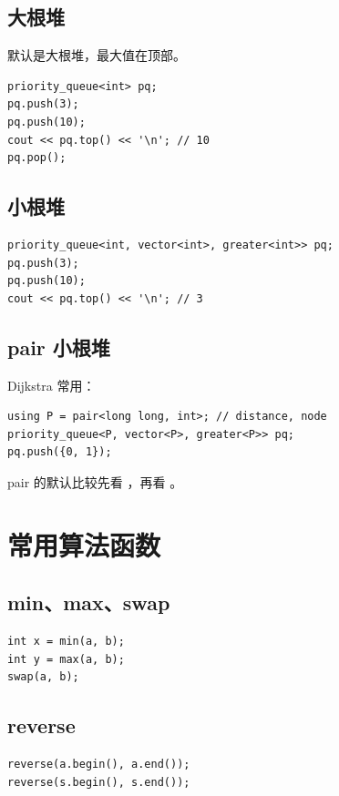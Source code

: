 \subsection{大根堆}

默认是大根堆，最大值在顶部。

\begin{lstlisting}
priority_queue<int> pq;
pq.push(3);
pq.push(10);
cout << pq.top() << '\n'; // 10
pq.pop();
\end{lstlisting}

\subsection{小根堆}

\begin{lstlisting}
priority_queue<int, vector<int>, greater<int>> pq;
pq.push(3);
pq.push(10);
cout << pq.top() << '\n'; // 3
\end{lstlisting}

\subsection{pair 小根堆}

Dijkstra 常用：

\begin{lstlisting}
using P = pair<long long, int>; // distance, node
priority_queue<P, vector<P>, greater<P>> pq;
pq.push({0, 1});
\end{lstlisting}

pair 的默认比较先看 ，再看 。

\section{常用算法函数}\label{sec:04-22}

\subsection{min、max、swap}

\begin{lstlisting}
int x = min(a, b);
int y = max(a, b);
swap(a, b);
\end{lstlisting}

\subsection{reverse}

\begin{lstlisting}
reverse(a.begin(), a.end());
reverse(s.begin(), s.end());
\end{lstlisting}

